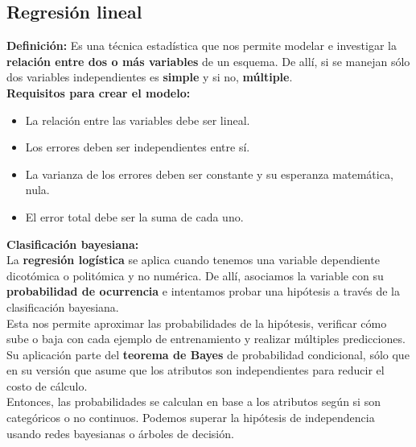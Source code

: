 \subsection*{Regresión lineal}
\textbf{Definición:} Es una técnica estadística que nos permite modelar e investigar la \textbf{relación entre dos o más variables} de un esquema. De allí, si se manejan sólo dos variables independientes es \textbf{simple} y si no, \textbf{múltiple}. \\
\textbf{Requisitos para crear el modelo:}
\begin{itemize}
    \item La relación entre las variables debe ser lineal.
    \item Los errores deben ser independientes entre sí.
    \item La varianza de los errores deben ser constante y su esperanza matemática, nula.
    \item El error total debe ser la suma de cada uno.
\end{itemize}
\textbf{Clasificación bayesiana:} \\
La \textbf{regresión logística} se aplica cuando tenemos una variable dependiente dicotómica o politómica y no numérica. De allí, asociamos la variable con su \textbf{probabilidad de ocurrencia} e intentamos probar una hipótesis a través de la clasificación bayesiana. \\
Esta nos permite aproximar las probabilidades de la hipótesis, verificar cómo sube o baja con cada ejemplo de entrenamiento y realizar múltiples predicciones. Su aplicación parte del \textbf{teorema de Bayes} de probabilidad condicional, sólo que en su versión  que asume que los atributos son independientes para reducir el costo de cálculo. \\
Entonces, las probabilidades  se calculan en base a los atributos según si son categóricos o no continuos. Podemos superar la hipótesis de independencia usando redes bayesianas o árboles de decisión.


